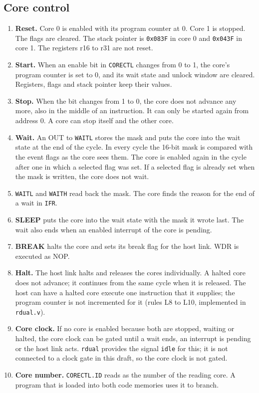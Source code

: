 \documentclass[10pt,a4paper]{article}
\newcommand{\reg}[1]{\texttt{#1}}
\begin{document}
\subsection{Core control}

\begin{enumerate}[label=\textbf{H\arabic*},leftmargin=2.6em]
\item \textbf{Reset.} Core 0 is enabled with its program counter at 0. Core 1 is stopped. The flags are cleared.
The stack pointer is \texttt{0x083F} in core 0 and \texttt{0x043F} in core 1. The registers r16 to r31 are not
reset.
\item \textbf{Start.} When an enable bit in \reg{CORECTL} changes from 0 to 1, the core's program counter is set
to 0, and its wait state and unlock window are cleared. Registers, flags and stack pointer keep their values.
\item \textbf{Stop.} When the bit changes from 1 to 0, the core does not advance any more, also in the middle of an instruction. It can only be started again from address 0. A core can stop itself and the other core.
\item \textbf{Wait.} An OUT to \reg{WAITL} stores the mask and puts the core into the wait state at the end of the
cycle. In every cycle the 16-bit mask is compared with the event flags as the core sees them. The core is
enabled again in the cycle after one in which a selected flag was set. If a selected flag is already set when
the mask is written, the core does not wait.
\item \reg{WAITL} and \reg{WAITH} read back the mask. The core finds the reason for the end of a wait in
\reg{IFR}.
\item \textbf{SLEEP} puts the core into the wait state with the mask it wrote last. The wait also ends when an
enabled interrupt of the core is pending.
\item \textbf{BREAK} halts the core and sets its break flag for the host link. WDR is executed as NOP.
\item \textbf{Halt.} The host link halts and releases the cores individually. A halted core does not advance; it continues from the same cycle when it is released. The host can have a halted core execute one instruction that it supplies; the program counter is not incremented for it (rules L8 to L10, implemented in \texttt{rdual.v}).
\item \textbf{Core clock.} If no core is enabled because both are stopped, waiting or halted, the core clock can
be gated until a wait ends, an interrupt is pending or the host link acts. \texttt{rdual} provides the signal \texttt{idle} for this; it is not connected to a clock gate in this draft, so the core clock is not gated.
\item \textbf{Core number.} \reg{CORECTL.ID} reads as the number of the reading core. A program that is loaded into
both code memories uses it to branch.
\end{enumerate}
\end{document}
